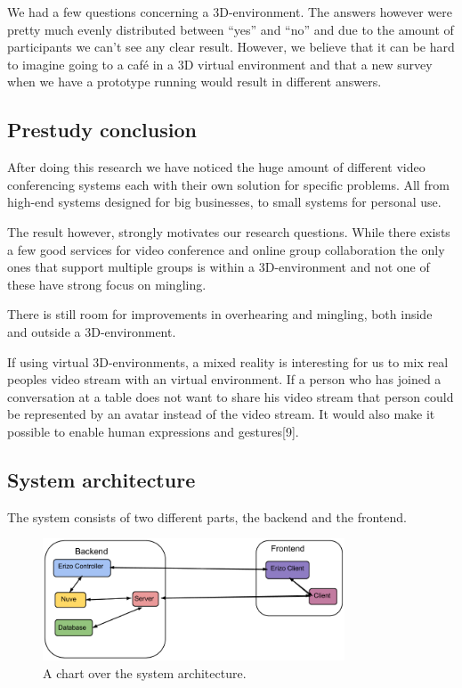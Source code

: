 \documentclass[12pt, titlepage]{article}
\begin{document}
We had a few questions concerning a 3D-environment. The answers however were pretty much evenly distributed between “yes” and “no” and due to the amount of participants we can't see any clear result. However, we believe that it can be hard to imagine going to a café in a 3D virtual environment and that a new survey when we have a prototype running would result in different answers.
\subsection{Prestudy conclusion}
After doing this research we have noticed the huge amount of different video conferencing systems each with their own solution for specific problems. All from high-end systems designed for big businesses, to small systems for personal use.

The result however, strongly motivates our research questions. While there exists a few good services for video conference and online group collaboration the only ones that support multiple groups is within a 3D-environment and not one of these have strong focus on mingling.

There is still room for improvements in overhearing and mingling, both inside and outside a 3D-environment.

If using virtual 3D-environments, a mixed reality is interesting for us to mix real peoples video stream with an virtual environment. If a person who has joined a conversation at a table does not want to share his video stream that person could be represented by an avatar instead of the video stream. It would also make it possible to enable human expressions and gestures[9].
\subsection{System architecture}
The system consists of two different parts, the backend and the frontend.
\begin{figure}[H]
  \centering
	\includegraphics[width=0.8\textwidth,keepaspectratio]{systemarchitecture.png}
  \caption{A chart over the system architecture.}
\end{figure}
\end{document}
